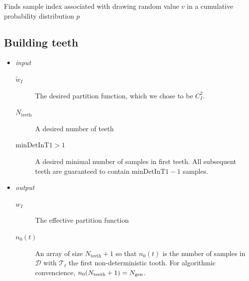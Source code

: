 \documentclass[./thesis.tex]{subfiles}
\newcommand{\minDetInT}{\text{minDetInT1}}
\newcommand{\Nteeth}{N_\text{teeth}}
\begin{document}
\begin{algorithm}
\label{alg:FIND_SAMPLE}
\caption[FIND\_SAMPLE]{Finds sample index associated with drawing random value $v$ in a cumulative probability distribution $p$}

	
	
\end{algorithm}




\subsection{Building teeth}

\begin{itemize}

\item
\emph{input}
\begin{description}
\item[$\tilde w_I$]
The desired partition function, which we chose to be $C_I^2$.
\item[$\Nteeth$]
A desired number of teeth
\item[$\minDetInT > 1$]
A desired minimal number of samples in first teeth. All subsequent teeth are guaranteed to contain $\minDetInT-1$ samples.
\end{description}

\item
\emph{output}
\begin{description}
\item[$w_I$]
The effective partition function
\item[$n_0(t)$]
An array of size $\Nteeth+1$ so that $n_0(t)$ is the number of samples in $\mathcal{D}$ with $\mathcal{T}_t$ the first non-deterministic tooth. For algorithmic convencience, $n_0(\Nteeth+1)=\Ngen$.
\end{description}
\end{itemize}
\end{document}
